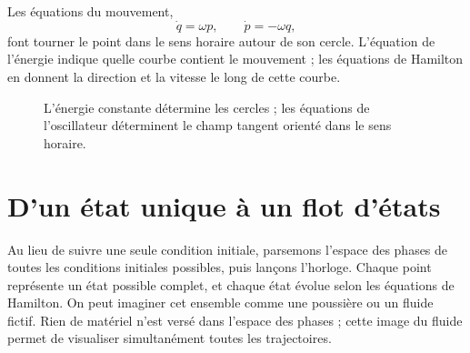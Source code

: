 Les équations du mouvement,
\begin{equation}
  \dot q=\omega p,\qquad \dot p=-\omega q,
  \label{eq:l7-oscillator-flow}
\end{equation}
font tourner le point dans le sens horaire autour de son cercle. L’équation de l’énergie indique quelle courbe contient le mouvement ; les équations de Hamilton en donnent la direction et la vitesse le long de cette courbe.

\begin{figure}[htbp]
  \centering
  \caption{L’énergie constante détermine les cercles ; les équations de l’oscillateur déterminent le champ tangent orienté dans le sens horaire.}
\end{figure}

\begin{classroomqa}
\end{classroomqa}

\section{D’un état unique à un flot d’états}

Au lieu de suivre une seule condition initiale, parsemons l’espace des phases de toutes les conditions initiales possibles, puis lançons l’horloge. Chaque point représente un état possible complet, et chaque état évolue selon les équations de Hamilton. On peut imaginer cet ensemble comme une poussière ou un fluide fictif. Rien de matériel n’est versé dans l’espace des phases ; cette image du fluide permet de visualiser simultanément toutes les trajectoires.

